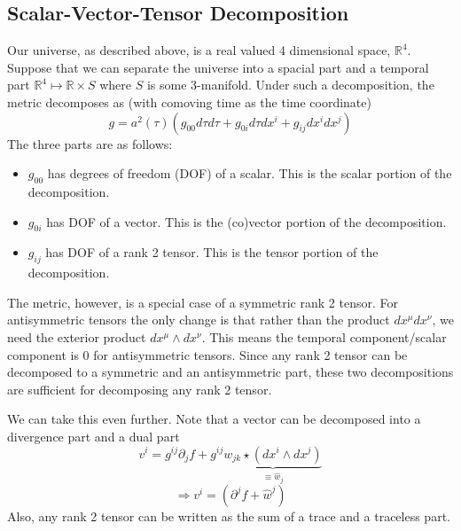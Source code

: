 \subsection{Scalar-Vector-Tensor Decomposition}
Our universe, as described above, is a real valued 4 dimensional space, $\mathbb{R}^4$. Suppose that we can separate the universe into a spacial part and a temporal part $\mathbb{R}^4 \mapsto \mathbb{R} \times S$ where $S$ is some $3$-manifold. Under such a decomposition, the metric decomposes as (with comoving time as the time coordinate)
\[ g = a^2(\tau)\left( g_{00}d\tau d\tau + g_{0i}d\tau dx^{i} + g_{ij} dx^{i}dx^{j} \right) \]
The three parts are as follows:
\begin{itemize}
    \item $g_{00}$ has degrees of freedom (DOF) of a scalar. This is the scalar portion of the decomposition.
    \item $g_{0i}$ has DOF of a vector. This is the (co)vector portion of the decomposition.
    \item $g_{ij}$ has DOF of a rank 2 tensor. This is the tensor portion of the decomposition.
\end{itemize}
The metric, however, is a special case of a symmetric rank 2 tensor. For antisymmetric tensors the only change is that rather than the product $dx^\mu dx^\nu$, we need the exterior product $dx^\mu \wedge dx^\nu$. This means the temporal component/scalar component is 0 for antisymmetric tensors. Since any rank 2 tensor can be decomposed to a symmetric and an antisymmetric part, these two decompositions are sufficient for decomposing any rank 2 tensor. 

We can take this even further. Note that a vector can be decomposed into a divergence part and a dual part
\[ v^i = g^{ij}\partial_j f + g^{ij} \underbrace{w_{jk}\star (dx^{i} \wedge dx^{j})}_{\equiv \hat{w}_j} \]
\[ \Rightarrow v^i = (\partial^j f + \hat{w}^j) \]
Also, any rank 2 tensor can be written as the sum of a trace and a traceless part.

